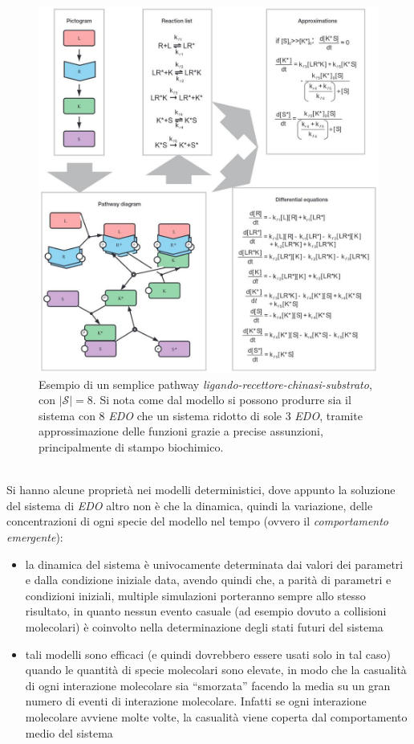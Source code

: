 \documentclass[a4paper,12pt, oneside]{book}
\begin{document}
\begin{figure}
  \centering
  \includegraphics[width = \textwidth]{img/edo1.jpg}
  \caption{Esempio di un semplice pathway
    \textit{ligando-recettore-chinasi-substrato}, con $|\mathcal{S}|=8$. Si nota 
    come dal modello si possono produrre sia il sistema con 8 \textit{EDO} che
    un sistema ridotto di sole 3 \textit{EDO}, tramite approssimazione delle
    funzioni grazie a precise assunzioni, principalmente di stampo biochimico.} 
  \label{fig:edo1}
\end{figure}
\\
\noindent
Si hanno alcune proprietà nei modelli deterministici, dove appunto la soluzione
del sistema di \textit{EDO} altro non è che la dinamica, quindi la variazione,
delle concentrazioni di ogni specie del modello nel tempo (ovvero il
\textit{comportamento emergente}):
\begin{itemize}
  \item la dinamica del sistema è univocamente determinata dai valori dei
  parametri e dalla condizione iniziale data, avendo quindi che, a parità di
  parametri e condizioni iniziali, multiple simulazioni porteranno sempre allo
  stesso risultato, in quanto nessun evento casuale (ad esempio dovuto a
  collisioni molecolari) è coinvolto nella determinazione degli stati futuri del
  sistema  
  \item tali modelli sono efficaci (e quindi dovrebbero essere usati solo in tal
  caso) quando le quantità di specie molecolari sono
  elevate, in modo che la casualità di ogni interazione molecolare sia
  ``smorzata'' facendo la media su un gran numero di eventi di interazione
  molecolare. Infatti se ogni interazione molecolare avviene molte volte, la
  casualità viene coperta dal comportamento medio del sistema 
\end{itemize}
\end{document}
